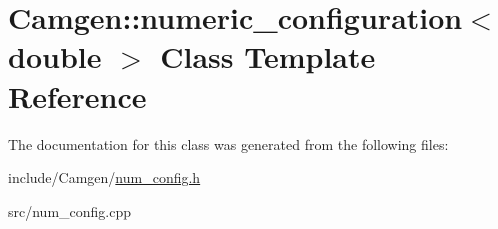 \hypertarget{a00383}{\section{Camgen\-:\-:numeric\-\_\-configuration$<$ double $>$ Class Template Reference}
\label{a00383}
}


The documentation for this class was generated from the following files\-:\begin{DoxyCompactItemize}
\item 
include/\-Camgen/\hyperlink{a00680}{num\-\_\-config.\-h}\item 
src/num\-\_\-config.\-cpp\end{DoxyCompactItemize}
